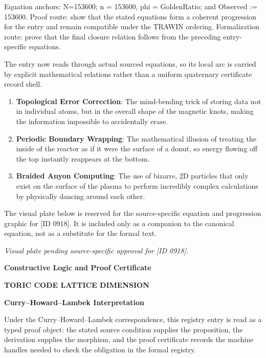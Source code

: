 Equation anchors: N=153600; n = 153600, phi = GoldenRatio; and Observed := 153600. Proof route: show that the stated equations form a coherent progression for the entry and remain compatible under the TRAWIN ordering. Formalization route: prove that the final closure relation follows from the preceding entry-specific equations.

The entry now reads through actual sourced equations, so its local arc is carried by explicit mathematical relations rather than a uniform quaternary certificate record shell.
\endgroup

\begin{enumerate}[leftmargin=1.6em,itemsep=6pt,topsep=4pt]
\item \textbf{Topological Error Correction}: The mind-bending trick of storing data not in individual atoms, but in the overall shape of the magnetic knots, making the information impossible to accidentally erase.
\item \textbf{Periodic Boundary Wrapping}: The mathematical illusion of treating the inside of the reactor as if it were the surface of a donut, so energy flowing off the top instantly reappears at the bottom.
\item \textbf{Braided Anyon Computing}: The use of bizarre, 2D particles that only exist on the surface of the plasma to perform incredibly complex calculations by physically dancing around each other.
\end{enumerate}

\begingroup\footnotesize\sloppy
The visual plate below is reserved for the source-specific equation and progression graphic for [ID 0918]. It is included only as a companion to the canonical equation, not as a substitute for the formal text.
\par\endgroup
\begingroup\footnotesize\itshape
Visual plate pending source-specific approval for [ID 0918].
\par\endgroup

\clearpage
\begingroup\tzpsupportsetup
\noindent\textbf{\fontsize{10.8pt}{12.8pt}\selectfont [ID 0918] Constructive Logic and Proof Certificate}\par
\noindent\textbf{\fontsize{10pt}{12pt}\selectfont TORIC CODE LATTICE DIMENSION}\par
\vspace{0.45em}
\begingroup
\footnotesize
\setlength{\parskip}{0.22em}
\setlength{\parindent}{0pt}
\noindent\textbf{Curry--Howard--Lambek Interpretation}\par
Under the Curry--Howard--Lambek correspondence, this registry entry is read as a typed proof
object: the stated source condition supplies the proposition, the derivation supplies the
morphism, and the proof certificate records the machine handles needed to check the obligation
in the formal registry.

